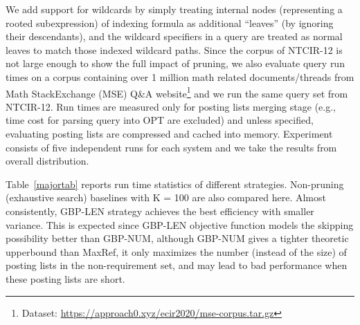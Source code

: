 \documentclass[runningheads]{llncs}
\begin{document}
We add support for wildcards by simply treating internal nodes (representing a rooted subexpression) of indexing formula as additional ``leaves'' (by ignoring their descendants), and the wildcard specifiers in a query are treated as normal leaves to match those indexed wildcard paths.
Since the corpus of NTCIR-12 is not large enough to show the full impact of pruning, we also evaluate query run times on a corpus containing over 1 million math related documents/threads from Math StackExchange (MSE) Q\&A website\footnote{Dataset: \url{https://approach0.xyz/ecir2020/mse-corpus.tar.gz}} and we run the same query set from NTCIR-12.
%
Run times are measured only for posting lists merging stage (e.g., time cost for parsing query into OPT are excluded) and unless specified, evaluating posting lists are compressed and cached into memory.
%
Experiment consists of five independent runs for each system and we take the results from overall distribution.

Table~\ref{majortab} reports run time statistics of different strategies.
Non-pruning (exhaustive search) baselines with K = 100 are also compared here.
Almost consistently, GBP-LEN strategy achieves the best efficiency with smaller variance.
This is expected since GBP-LEN objective function models the skipping possibility better than GBP-NUM, although GBP-NUM gives a tighter theoretic upperbound than MaxRef, it only maximizes the number (instead of the size) of posting lists in the non-requirement set, and may lead to bad performance when these posting lists are short.
\end{document}
